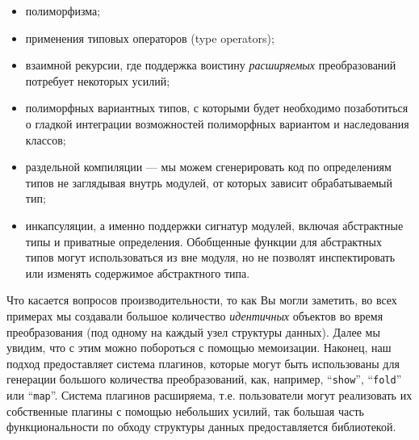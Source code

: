 \begin{itemize}
\item полиморфизма;
\item применения типовых операторов (type operators);
\item взаимной рекурсии, где поддержка воистину \emph{расширяемых} преобразований потребует некоторых усилий;
\item полиморфных вариантных типов, с которыми будет необходимо позаботиться о гладкой интеграции возможностей полиморфных вариантом и наследования классов;
\item раздельной компиляции --- мы можем сгенерировать код по определениям типов не заглядывая внутрь модулей, от которых зависит обрабатываемый тип;
\item инкапсуляции, а именно поддержки сигнатур модулей, включая абстрактные типы и приватные определения. Обобщенные функции для абстрактных типов могут использоваться из вне модуля, но не позволят инспектировать или изменять содержимое абстрактного типа.
\end{itemize}

Что касается вопросов производительности, то как Вы могли заметить, во всех примерах мы создавали большое количество 
\emph{идентичных} объектов во время преобразования (под одному на каждый узел структуры данных). Далее мы увидим, что с этим можно побороться
с помощью мемоизации. Наконец, наш подход предоставляет система плагинов, которые могут быть использованы для генерации большого количества преобразований, как, например, ``\lstinline{show}'', ``\lstinline{fold}'' или ``\lstinline{map}''. Система плагинов расширяема, т.е. пользователи могут  реализовать их собственные плагины с помощью небольших усилий, так большая часть функциональности по обходу структуры данных предоставляется библиотекой. 


